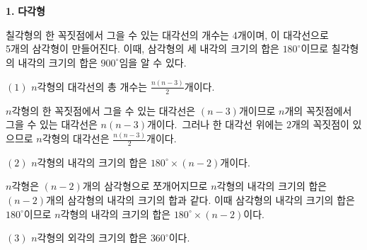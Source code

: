 
\begin{flushleft}
    {\setmainfont[Path=FONT/]{KOPUBWORLD_DOTUM_PRO_BOLD.OTF} {\textcolor{skyblue2}{{\huge\textbf{1.}}}}}
    { {\textcolor{skyblue2}{{\huge\textbf{다각형}}}}}
\end{flushleft}

\begin{flushleft}
    칠각형의 한 꼭짓점에서 그을 수 있는 대각선의 개수는 4개이며, 
    이 대각선으로 \\ 5개의 삼각형이 만들어진다.
    이때, 삼각형의 세 내각의 크기의 합은 $180^{\circ}$이므로
    칠각형의 내각의 크기의 합은 $900^{\circ}$임을 알 수 있다. 
\end{flushleft}

\begin{flushleft}
    {$(1)$ $n$각형의 대각선의 총 개수는 $\frac{n(n-3)}{2}$개이다.}
\end{flushleft}

\begin{tcolorbox}[colback = white, colframe = blue!35!skyblue, title = \textmd{이해하기}]
    $n$각형의 한 꼭짓점에서 그을 수 있는 대각선은 $(n-3)$개이므로
    $n$개의 꼭짓점에서 그을 수 있는 대각선은 $n(n-3)$개이다.
    \,그러나 한 대각선 위에는 $2$개의 꼭짓점이 있으므로 $n$각형의 대각선은
    $\frac{n(n-3)}{2}$개이다.
\end{tcolorbox}


\begin{flushleft}
    $(2)$ $n$각형의 내각의 크기의 합은 $180^{\circ} \times (n-2)$개이다.
\end{flushleft}

\begin{tcolorbox}[colback = white, colframe = blue!35!skyblue, title = \textmd{이해하기}]
    $n$각형은 $(n-2)$개의 삼각형으로 쪼개어지므로 $n$각형의 내각의 크기의 합은
    $(n-2)$개의 삼각형의 내각의 크기의 합과 같다. 이때 삼각형의 내각의 크기의 합은
    $180^{\circ}$이므로 $n$각형의 내각의 크기의 합은 $180^{\circ} \times (n-2)$이다.
\end{tcolorbox}

\begin{flushleft}
    $(3)$ $n$각형의 외각의 크기의 합은 $360^{\circ}$이다.
\end{flushleft}

